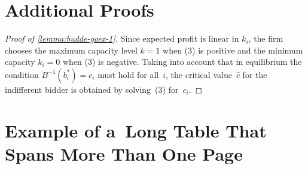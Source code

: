 \begin{appendix}

\section{Additional Proofs}
\label{app:proofs}

\begin{proof}[Proof of \autoref{lemma:budde-goex-1}]
	Since expected profit is linear in $k_i$, the firm chooses the maximum capacity level ${k = 1}$ when (3) is positive and the minimum capacity ${k_i = 0}$ when (3) is negative. Taking into account that in equilibrium the condition ${B^{-1}(b_i^*) = c_i}$ must hold for all~$i$, the critical value~$\hat{c}$ for the indifferent bidder is obtained by solving~(3) for~$c_i$.
\end{proof}

\clearpage

\raggedbottom

\section{Example of a~Long Table That Spans More Than One Page}

\newcommand{\pz}{\phantom{0}}
\def\tablecapstrut{\vrule height\baselinedist depth1ex width0pt}

\begingroup


\end{appendix}
